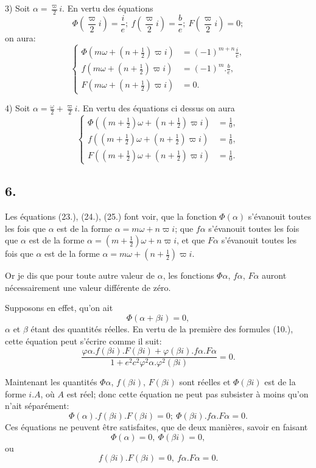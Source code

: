 \documentclass{article}
\begin{document}
3) Soit $\alpha=\frac{\varpi}{2}i$. En vertu des équations
\[ \Phi\left(\frac{\varpi}{2}i\right)=\frac{i}{e};\ f\left(\frac{\varpi}{2}i\right)=\frac{b}{e};\ F\left(\frac{\varpi}{2}i\right)=0; \]
on aura:
\[ \left\{\begin{aligned} \Phi(m\omega+(n+\tfrac{1}{2})\varpi i)&=(-1)^{m+n}\frac{i}{e},\\ f(m\omega+(n+\tfrac{1}{2})\varpi i)&=(-1)^{m}.\frac{b}{e},\\ F(m\omega+(n+\tfrac{1}{2})\varpi i)&=0. \end{aligned}\right. \tag{25.} \]

4) Soit $\alpha=\frac{\omega}{2}+\frac{\varpi}{2}i$. En vertu des équations ci dessus on aura
\[ \left\{\begin{aligned} \Phi((m+\tfrac{1}{2})\omega+(n+\tfrac{1}{2})\varpi i)&=\frac{1}{0},\\ f((m+\tfrac{1}{2})\omega+(n+\tfrac{1}{2})\varpi i)&=\frac{1}{0},\\ F((m+\tfrac{1}{2})\omega+(n+\tfrac{1}{2})\varpi i)&=\frac{1}{0}. \end{aligned}\right. \tag{26.} \]

\subsection*{6.}

Les équations (23.), (24.), (25.) font voir, que la fonction $\Phi(\alpha)$ s'évanouit toutes les fois que $\alpha$ est de la forme $\alpha=m\omega+n\varpi i$; que $f\alpha$ s'évanouit toutes les fois que $\alpha$ est de la forme $\alpha=(m+\frac{1}{2})\omega+n\varpi i$, et que $F\alpha$ s'évanouit toutes les fois que $\alpha$ est de la forme $\alpha=m\omega+(n+\frac{1}{2})\varpi i$.

Or je dis que pour toute autre valeur de $\alpha$, les fonctions $\Phi\alpha$, $f\alpha$, $F\alpha$ auront nécessairement une valeur différente de zéro.

Supposons en effet, qu'on ait
\[ \Phi(\alpha+\beta i)=0, \]
$\alpha$ et $\beta$ étant des quantités réelles. En vertu de la première des formules (10.), cette équation peut s'écrire comme il suit:
\[ \frac{\varphi\alpha.f(\beta i).F(\beta i)+\varphi(\beta i).f\alpha.F\alpha}{1+e^{2}c^{2}\varphi^{2}\alpha.\varphi^{2}(\beta i)}=0. \]

Maintenant les quantités $\Phi\alpha$, $f(\beta i)$, $F(\beta i)$ sont réelles et $\Phi(\beta i)$ est de la forme $i.A$, où $A$ est réel; donc cette équation ne peut pas subsister à moins qu'on n'ait séparément:
\[ \Phi(\alpha).f(\beta i).F(\beta i)=0;\ \Phi(\beta i).f\alpha.F\alpha=0. \]
Ces équations ne peuvent être satisfaites, que de deux manières, savoir en faisant
\[ \Phi(\alpha)=0,\ \Phi(\beta i)=0, \]
ou
\[ f(\beta i).F(\beta i)=0,\ f\alpha.F\alpha=0. \]
\end{document}
